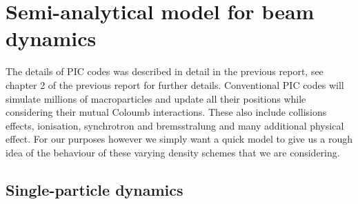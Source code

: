\chapter{Semi-analytical model for beam dynamics} 
The details of PIC codes was described in detail in the previous report, see chapter 2 of the previous report for further details. Conventional PIC codes will simulate millions of macroparticles and update all their positions while considering their mutual Coloumb interactions. These also include collisions effects, ionisation, synchrotron and bremsstralung and many additional physical effect. For our purposes however we simply want a quick model to give us a rough idea of the behaviour of these varying density schemes that we are considering. 
\section{Single-particle dynamics}
